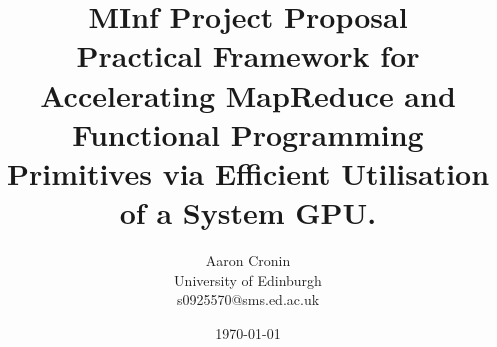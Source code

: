 \begin{titlepage}
  \title{{\small MInf Project Proposal}\\Practical Framework for Accelerating MapReduce and Functional Programming Primitives via Efficient Utilisation of a System GPU.}   %
\author{Aaron Cronin\\University of Edinburgh\\ s0925570@sms.ed.ac.uk}         %

\date{\today}    %
\end{titlepage}

